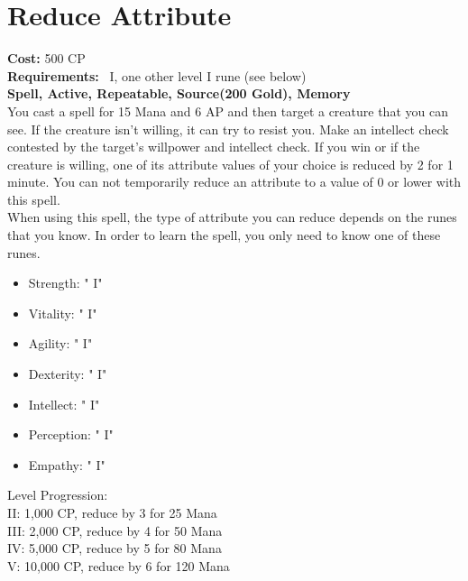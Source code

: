 \section{Reduce Attribute}\label{spell:reduceAbility}
\textbf{Cost:} 500 CP\\
\textbf{Requirements:}~ I, one other level I rune (see below)\\
\textbf{Spell, Active, Repeatable, Source(200 Gold), Memory}\\
You cast a spell for 15 Mana and 6 AP and then target a creature that you can see.
If the creature isn't willing, it can try to resist you.
Make an intellect check contested by the target's willpower and intellect check.
If you win or if the creature is willing, one of its attribute values of your choice is reduced by 2 for 1 minute.
You can not temporarily reduce an attribute to a value of 0 or lower with this spell. \\
When using this spell, the type of attribute you can reduce depends on the runes that you know.
In order to learn the spell, you only need to know one of these runes.\\
\begin{itemize}
    \item Strength: " I"
    \item Vitality: " I"
    \item Agility: " I"
    \item Dexterity: " I"
    \item Intellect: " I"
    \item Perception: " I"
    \item Empathy: " I"
\end{itemize}
Level Progression:\\
II: 1,000 CP, reduce by 3 for 25 Mana\\
III: 2,000 CP, reduce by 4 for 50 Mana\\
IV: 5,000 CP, reduce by 5 for 80 Mana\\
V: 10,000 CP, reduce by 6 for 120 Mana\\
